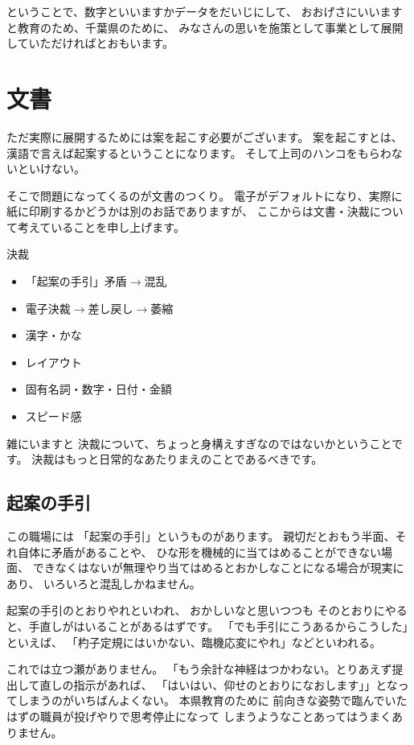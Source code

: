 \documentclass[uplatex,jis2004,dvipdfmx,12pt]{jsarticle}
\begin{document}
ということで、数字といいますかデータをだいじにして、
おおげさにいいますと教育のため、千葉県のために、
みなさんの思いを施策として事業として展開していただければとおもいます。


\section{文書}
ただ実際に展開するためには案を起こす必要がございます。
案を起こすとは、漢語で言えば起案するということになります。
そして上司のハンコをもらわないといけない。

そこで問題になってくるのが文書のつくり。
電子がデフォルトになり、実際に紙に印刷するかどうかは別のお話でありますが、
ここからは文書・決裁について考えていることを申し上げます。

決裁
       \begin{itemize}
	\item 「起案の手引」矛盾$\longrightarrow${}混乱
	\item 電子決裁$\longrightarrow${}差し戻し$\longrightarrow${}萎縮
	\item 漢字・かな
	\item レイアウト
	\item 固有名詞・数字・日付・金額
	\item スピード感
   \end{itemize}

雑にいますと
決裁について、ちょっと身構えすぎなのではないかということです。
決裁はもっと日常的なあたりまえのことであるべきです。

\subsection{起案の手引}
この職場には
「起案の手引」というものがあります。
親切だとおもう半面、それ自体に矛盾があることや、
ひな形を機械的に当てはめることができない場面、
できなくはないが無理やり当てはめるとおかしなことになる場合が現実にあり、
いろいろと混乱しかねません。

起案の手引のとおりやれといわれ、
おかしいなと思いつつも
そのとおりにやると、手直しがはいることがあるはずです。
「でも手引にこうあるからこうした」といえば、
「杓子定規にはいかない、臨機応変にやれ」などといわれる。

これでは立つ瀬がありません。
「もう余計な神経はつかわない。とりあえず提出して直しの指示があれば、
「はいはい、仰せのとおりになおします」」となってしまうのがいちばんよくない。
本県教育のために
前向きな姿勢で臨んでいたはずの職員が投げやりで思考停止になって
しまうようなことあってはうまくありません。
\end{document}
